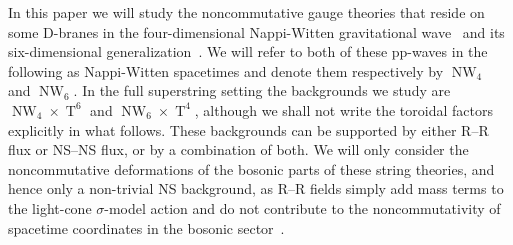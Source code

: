 \documentclass[11pt,a4paper]{article}
\DeclareMathOperator{\Torus}{T}
\DeclareMathOperator{\NW}{NW}
\begin{document}
In this paper we will study the noncommutative gauge theories that
reside on some D-branes in the four-dimensional Nappi-Witten gravitational
wave~\cite{NW1} and its six-dimensional generalization~\cite{KM1}. We
will refer to both of these pp-waves in the following as Nappi-Witten
spacetimes and denote them respectively by $\NW_4$ and $\NW_6$. In the
full superstring setting the backgrounds we study are $\NW_4\times\Torus^6$ and
$\NW_6\times\Torus^4$, although we shall not write the toroidal factors
explicitly in what follows. These backgrounds can be
supported by either R--R flux or NS--NS flux, or by a combination of
both. We will only consider the noncommutative deformations of the
bosonic parts of these string theories, and hence only a non-trivial
NS background, as R--R fields simply add mass terms to the light-cone
$\sigma$-model action and do not contribute to the noncommutativity of
spacetime coordinates in the bosonic sector~\cite{CH1,Seiberg1}.
\end{document}

